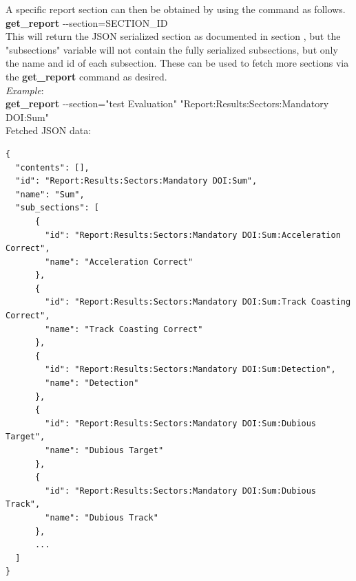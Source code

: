 A specific report section can then be obtained by using the command as follows. \\

\textbf{get\_report} -{}-section=SECTION\_ID \\

This will return the JSON serialized section as documented in section ,
but the "subsections" variable will not contain the fully serialized subsections,
but only the name and id of each subsection. These can be used to fetch more sections 
via the \textbf{get\_report} command as desired. \\

\textit{Example}: \\

\textbf{get\_report} -{}-section="test Evaluation" "Report:Results:Sectors:Mandatory DOI:Sum" \\

Fetched JSON data: \\

\begin{lstlisting}[basicstyle=\tiny\ttfamily]
{
  "contents": [],
  "id": "Report:Results:Sectors:Mandatory DOI:Sum",
  "name": "Sum",
  "sub_sections": [
      {
        "id": "Report:Results:Sectors:Mandatory DOI:Sum:Acceleration Correct",
        "name": "Acceleration Correct"
      },
      {
        "id": "Report:Results:Sectors:Mandatory DOI:Sum:Track Coasting Correct",
        "name": "Track Coasting Correct"
      },
      {
        "id": "Report:Results:Sectors:Mandatory DOI:Sum:Detection",
        "name": "Detection"
      },
      {
        "id": "Report:Results:Sectors:Mandatory DOI:Sum:Dubious Target",
        "name": "Dubious Target"
      },
      {
        "id": "Report:Results:Sectors:Mandatory DOI:Sum:Dubious Track",
        "name": "Dubious Track"
      },
      ...
  ]
}
\end{lstlisting}

